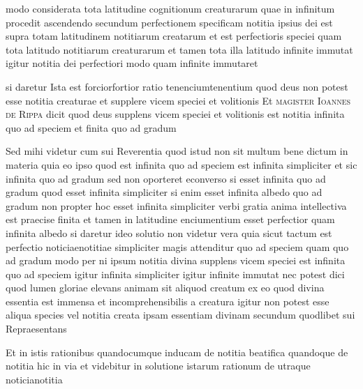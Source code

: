 \documentclass[twoside, openright]{report}
\newcommand{\name}[1]{\textsc{#1}}
\begin{document}
        \pstart
        modo considerata tota latitudine cognitionum creaturarum quae in infinitum procedit ascendendo secundum perfectionem specificam notitia ipsius dei est supra totam latitudinem notitiarum creatarum et est perfectioris speciei quam tota latitudo notitiarum creaturarum et tamen tota illa latitudo infinite immutat igitur notitia dei perfectiori modo quam infinite immutaret
        \pend
     
        \pstart
        si daretur Ista est forciorfortior ratio tenenciumtenentium quod deus non potest esse notitia creaturae et supplere vicem speciei et volitionis Et \name{magister Ioannes de Rippa} dicit quod deus supplens vicem speciei et volitionis est notitia infinita quo ad speciem et finita quo ad gradum
        \pend
     
        \pstart
        Sed mihi videtur cum sui Reverentia quod istud non sit multum bene dictum in materia quia eo ipso quod est infinita quo ad speciem est infinita simpliciter et sic infinita quo ad gradum sed non oporteret econverso si esset infinita quo ad gradum quod esset infinita simpliciter si enim esset infinita albedo quo ad gradum non propter hoc esset infinita simpliciter verbi gratia anima intellectiva est praecise finita et tamen in latitudine enciumentium esset perfectior quam infinita albedo si daretur ideo solutio non videtur vera quia sicut tactum est perfectio noticiaenotitiae simpliciter magis attenditur quo ad speciem quam quo ad gradum modo per ni ipsum notitia divina supplens vicem speciei est infinita quo ad speciem igitur infinita simpliciter igitur infinite immutat nec potest dici quod lumen gloriae elevans animam sit aliquod creatum ex eo quod divina essentia est immensa et incomprehensibilis a creatura igitur non potest esse aliqua species vel notitia creata ipsam essentiam divinam secundum quodlibet sui Repraesentans
        \pend
     
        \pstart
        Et in istis rationibus quandocumque inducam de notitia beatifica quandoque de notitia hic in via et videbitur in solutione istarum rationum de utraque noticianotitia
        \pend
      
        \bigskip
\end{document}
